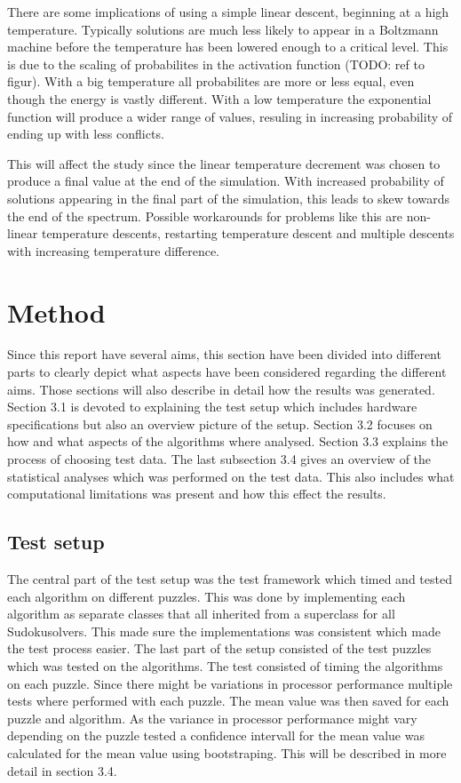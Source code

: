 \documentclass[a4paper,11pt]{kth-mag}
\begin{document}
There are some implications of using a simple linear descent, beginning at a high temperature.
Typically solutions are much less likely to appear in a Boltzmann machine before the temperature has been lowered enough to a critical level.
This is due to the scaling of probabilites in the activation function (TODO: ref to figur).
With a big temperature all probabilites are more or less equal, even though the energy is vastly different.
With a low temperature the exponential function will produce a wider range of values, resuling in increasing probability of ending up with less conflicts.

This will affect the study since the linear temperature decrement was chosen to produce a final value at the end of the simulation.
With increased probability of solutions appearing in the final part of the simulation, this leads to skew towards the end of the spectrum.
Possible workarounds for problems like this are non-linear temperature descents, restarting temperature descent and multiple descents with increasing temperature difference.


\chapter{Method}
Since this report have several aims, this section have been divided into different parts to clearly depict what aspects have been considered regarding the different aims. 
Those sections will also describe in detail how the results was generated. 
Section 3.1 is devoted to explaining the test setup which includes hardware specifications but also an overview picture of the setup. 
Section 3.2 focuses on how and what aspects of the algorithms where analysed.
Section 3.3 explains the process of choosing test data.
The last subsection 3.4 gives an overview of the statistical analyses which was performed on the test data.
This also includes what computational limitations was present and how this effect the results. 

\section{Test setup}
The central part of the test setup was the test framework which timed and tested each algorithm on different puzzles. 
This was done by implementing each algorithm as separate classes that all inherited from a superclass for all Sudokusolvers.
This made sure the implementations was consistent which made the test process easier.
The last part of the setup consisted of the test puzzles which was tested on the algorithms.
The test consisted of timing the algorithms on each puzzle. 
Since there might be variations in processor performance multiple tests where performed with each puzzle. 
The mean value was then saved for each puzzle and algorithm.
As the variance in processor performance might vary depending on the puzzle tested a confidence intervall for the mean value was calculated for the mean value using bootstraping. 
This will be described in more detail in section 3.4.
\end{document}
